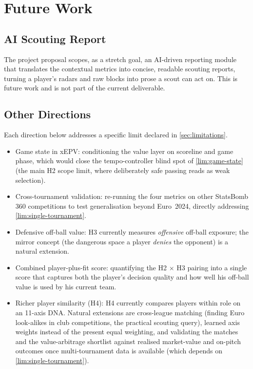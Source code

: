 \documentclass[12pt,a4paper]{article}
\begin{document}
\clearpage
\section{Future Work}\label{sec:future}

\subsection{AI Scouting Report}\label{sec:ai-report}

The project proposal scopes, as a stretch goal, an AI-driven reporting module that translates the contextual metrics into concise, readable scouting reports, turning a player's radars and raw blocks into prose a scout can act on.
This is future work and is not part of the current deliverable.

\subsection{Other Directions}\label{sec:other-future}

Each direction below addresses a specific limit declared in \cref{sec:limitations}.
\begin{itemize}
    \item Game state in xEPV: conditioning the value layer on scoreline and game phase, which would close the tempo-controller blind spot of \cref{lim:game-state} (the main H2 scope limit, where deliberately safe passing reads as weak selection).
    \item Cross-tournament validation: re-running the four metrics on other StatsBomb 360 competitions to test generalisation beyond Euro~2024, directly addressing \cref{lim:single-tournament}.
    \item Defensive off-ball value: H3 currently measures \emph{offensive} off-ball exposure; the mirror concept (the dangerous space a player \emph{denies} the opponent) is a natural extension.
    \item Combined player-plus-fit score: quantifying the H2 $\times$ H3 pairing into a single score that captures both the player's decision quality and how well his off-ball value is used by his current team.
    \item Richer player similarity (H4): H4 currently compares players within role on an 11-axis DNA. Natural extensions are cross-league matching (finding Euro look-alikes in club competitions, the practical scouting query), learned axis weights instead of the present equal weighting, and validating the matches and the value-arbitrage shortlist against realised market-value and on-pitch outcomes once multi-tournament data is available (which depends on \cref{lim:single-tournament}).
\end{itemize}
\end{document}
